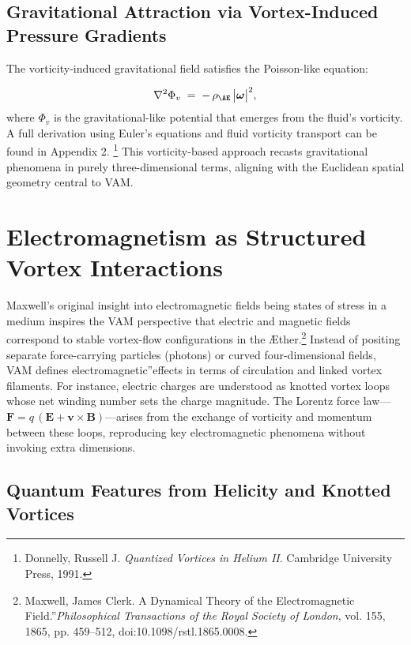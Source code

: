\subsection*{Gravitational Attraction via Vortex-Induced Pressure Gradients}
The vorticity-induced gravitational field satisfies the Poisson-like equation:

\[
    \nabla^2 \Phi_{v} \;=\; -\,\rho_{\mathrm{\AE}} \,\bigl|\boldsymbol{\omega}\bigr|^{2},
\]
where \(\Phi_{v}\) is the gravitational-like potential that emerges from the fluid's vorticity. A full derivation using Euler's equations and fluid vorticity transport can be found in Appendix 2.
\footnote{Donnelly, Russell J. \textit{Quantized Vortices in Helium II}. Cambridge University Press, 1991.} This vorticity-based approach recasts gravitational phenomena in purely three-dimensional terms, aligning with the Euclidean spatial geometry central to VAM.

\section{Electromagnetism as Structured Vortex Interactions}

Maxwell's original insight into electromagnetic fields being states of stress in a medium inspires the VAM perspective that electric and magnetic fields correspond to stable vortex-flow configurations in the Æther.\footnote{Maxwell, James Clerk. \grqq A Dynamical Theory of the Electromagnetic Field.\textquotedblright \textit{Philosophical Transactions of the Royal Society of London}, vol. 155, 1865, pp. 459–512, doi:10.1098/rstl.1865.0008.} Instead of positing separate force-carrying particles (photons) or curved four-dimensional fields, VAM defines \grqq electromagnetic\textquotedblright effects in terms of circulation and linked vortex filaments. For instance, electric charges are understood as knotted vortex loops whose net winding number sets the charge magnitude. The Lorentz force law—\(\mathbf{F} = q\,(\mathbf{E} + \mathbf{v}\times\mathbf{B})\)—arises from the exchange of vorticity and momentum between these loops, reproducing key electromagnetic phenomena without invoking extra dimensions.

\subsection*{Quantum Features from Helicity and Knotted Vortices}

